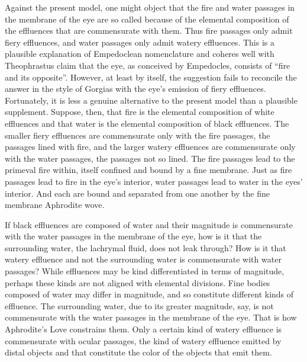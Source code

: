 Against the present model, one might object that the fire and water passages in the membrane of the eye are so called because of the elemental composition of the effluences that are commensurate with them. Thus fire passages only admit fiery effluences, and water passages only admit watery effluences. This is a plausible explanation of Empedoclean nomenclature and coheres well with Theophrastus claim that the eye, as conceived by Empedocles, consists of ``fire and its opposite''. However, at least by itself, the suggestion fails to reconcile the answer in the style of Gorgias with the eye's emission of fiery effluences. Fortunately, it is less a genuine alternative to the present model than a plausible supplement. Suppose, then, that fire is the elemental composition of white effluences and that water is the elemental composition of black effluences. The smaller fiery effluences are commensurate only with the fire passages, the passages lined with fire, and the larger watery effluences are commensurate only with the water passages, the passages not so lined. The fire passages lead to the primeval fire within, itself confined and bound by a fine membrane. Just as fire passages lead to fire in the eye's interior, water passages lead to water in the eyes' interior. And each are bound and separated from one another by the fine membrane Aphrodite wove.

If black effluences are composed of water and their magnitude is commensurate with the water passages in the membrane of the eye, how is it that the surrounding water, the lachrymal fluid, does not leak through? How is it that watery effluence and not the surrounding water is commensurate with water passages? While effluences may be kind differentiated in terms of magnitude, perhaps these kinds are not aligned with elemental divisions. Fine bodies composed of water may differ in magnitude, and so constitute different kinds of effluence. The surrounding water, due to its greater magnitude, say, is not commensurate with the water passages in the membrane of the eye. That is how Aphrodite's Love constrains them. Only a certain kind of watery effluence is commensurate with ocular passages, the kind of watery effluence emitted by distal objects and that constitute the color of the objects that emit them. 

